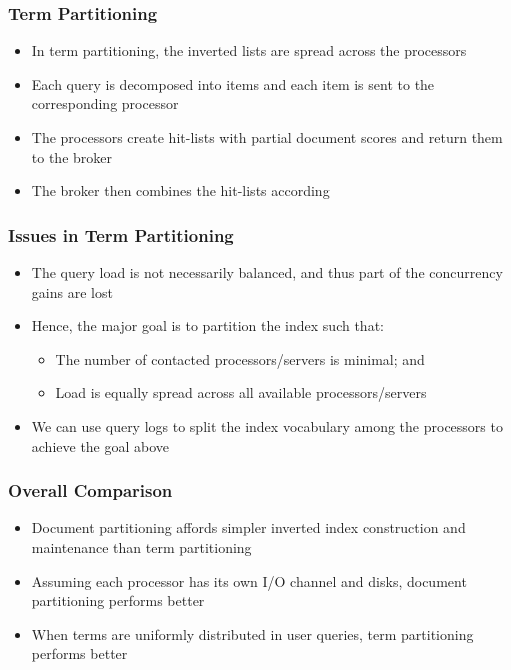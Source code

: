 \documentclass{beamer}
\begin{document}
\begin{frame}
    \frametitle{Term Partitioning}
    \begin{itemize}
    \item In term partitioning, the inverted lists are spread across the
        processors
    \item Each query is decomposed into items and each item is sent to the
        corresponding processor
    \item The processors create hit-lists with partial document scores and
        return them to the broker
    \item The broker then combines the hit-lists according
    \end{itemize}
\end{frame}

\begin{frame}
    \frametitle{Issues in Term Partitioning}
    \begin{itemize}
    \item The query load is not necessarily balanced, and thus part of the
        concurrency gains are lost
    \item Hence, the major goal is to partition the index such that:
        \begin{itemize}
        \item The number of contacted processors/servers is minimal; and
        \item Load is equally spread across all available processors/servers
        \end{itemize}
    \item We can use query logs to split the index vocabulary among the
        processors to achieve the goal above
    \end{itemize}
\end{frame}

\begin{frame}
    \frametitle{Overall Comparison}
    \begin{itemize}
    \item Document partitioning affords simpler inverted index construction and
        maintenance than term partitioning
    \item Assuming each processor has its own I/O channel and disks, document
        partitioning performs better
    \item When terms are uniformly distributed in user queries, term
        partitioning performs better
    \end{itemize}
\end{frame}
\end{document}
